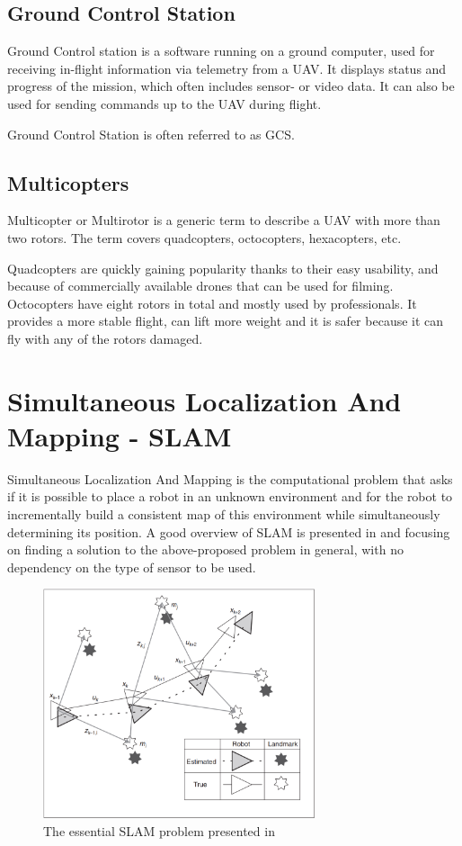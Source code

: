 \subsection{Ground Control Station}
Ground Control station is a software running on a ground computer, used for receiving in-flight information via telemetry from a UAV.
It displays status and progress of the mission, which often includes sensor- or video data. It can also be used
for sending commands up to the UAV during flight.

Ground Control Station is often referred to as GCS.

\subsection{Multicopters}
Multicopter or Multirotor is a generic term to describe a UAV with more than two rotors. The term covers quadcopters,
octocopters, hexacopters, etc.

Quadcopters are quickly gaining popularity thanks to their easy usability, and because of commercially available drones 
that can be used for filming. Octocopters have eight rotors in total and mostly used by professionals. It provides a more stable 
flight, can lift more weight and it is safer because it can fly with any of the rotors damaged.

\section{Simultaneous Localization And Mapping - SLAM}
Simultaneous Localization And Mapping is the computational problem that asks if it is possible to place a robot 
in an unknown environment and for the robot to incrementally build a consistent map of this environment while 
simultaneously determining its position. A good overview of SLAM is presented in\cite{durrant2006simultaneous} 
and \cite{diebel2006representing} focusing on finding a solution to the above-proposed problem in general, with no dependency 
on the type of sensor to be used.

\begin{figure}[!ht]
    \centering
	\includegraphics[width=80mm, keepaspectratio]{figures/slam_tutorial_basic_figure.png}
    \caption{The essential SLAM problem presented in \cite{durrant2006simultaneous} }
    \label{fig:slam_tutorial_basic}
\end{figure}

